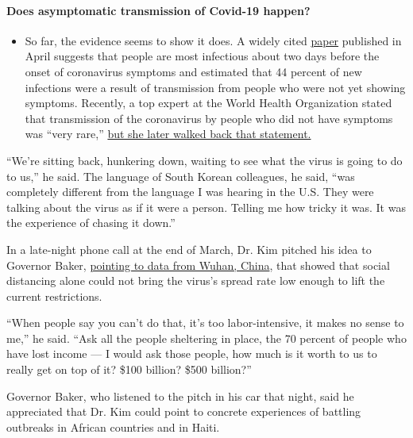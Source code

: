 \begin{itemize}
{  \paragraph{Does asymptomatic transmission of Covid-19
  happen?}\label{does-asymptomatic-transmission-of-covid-19-happen}}

  \begin{itemize}
  \tightlist
  \item
    So far, the evidence seems to show it does. A widely cited
    \href{https://www.nature.com/articles/s41591-020-0869-5}{paper}
    published in April suggests that people are most infectious about
    two days before the onset of coronavirus symptoms and estimated that
    44 percent of new infections were a result of transmission from
    people who were not yet showing symptoms. Recently, a top expert at
    the World Health Organization stated that transmission of the
    coronavirus by people who did not have symptoms was ``very rare,''
    \href{https://www.nytimes.com/2020/06/09/world/coronavirus-updates.html?action=click\&pgtype=Article\&state=default\&region=MAIN_CONTENT_3\&context=storylines_faq\#link-1f302e21}{but
    she later walked back that statement.}
  \end{itemize}
\end{itemize}

``We're sitting back, hunkering down, waiting to see what the virus is
going to do to us,'' he said. The language of South Korean colleagues,
he said, ``was completely different from the language I was hearing in
the U.S. They were talking about the virus as if it were a person.
Telling me how tricky it was. It was the experience of chasing it
down.''

In a late-night phone call at the end of March, Dr. Kim pitched his idea
to Governor Baker,
\href{https://www.medrxiv.org/content/10.1101/2020.03.03.20030593v1}{pointing
to data from Wuhan, China}, that showed that social distancing alone
could not bring the virus's spread rate low enough to lift the current
restrictions.

``When people say you can't do that, it's too labor-intensive, it makes
no sense to me,'' he said. ``Ask all the people sheltering in place, the
70 percent of people who have lost income --- I would ask those people,
how much is it worth to us to really get on top of it? \$100 billion?
\$500 billion?''

Governor Baker, who listened to the pitch in his car that night, said he
appreciated that Dr. Kim could point to concrete experiences of battling
outbreaks in African countries and in Haiti.

